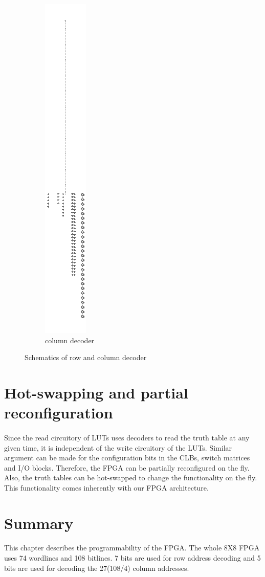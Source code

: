 \begin{figure}[h]
\begin{subfigure}{0.5\linewidth}
\includegraphics[]{columndecoder_schematic.png}
\caption{column decoder}
\label{fig:Figure}
\end{subfigure}
\caption{Schematics of row and column decoder}
\label{fig:Figure}
\end{figure}

\section{Hot-swapping and partial reconfiguration}
\paragraph{}
Since the read circuitory of LUTs uses decoders to read the truth table at any given time, it is independent of the write circuitory of the LUTs. Similar argument can be made for the configuration bits in the CLBs, switch matrices and I/O blocks. Therefore, the FPGA can be partially reconfigured on the fly. Also, the truth tables can be hot-swapped to change the functionality on the fly. This functionality comes inherently with our FPGA architecture.

\section{Summary}
\paragraph{}
This chapter describes the programmability of the FPGA. The whole 8X8 FPGA uses 74 wordlines and 108 bitlines. 7 bits are used for row address decoding and 5 bits are used for decoding the 27(108/4) column addresses.


